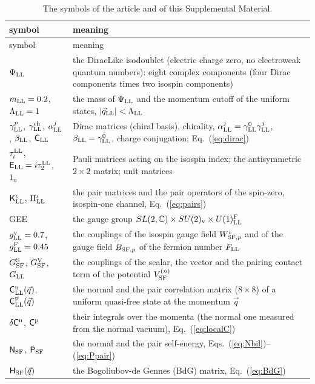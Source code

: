 \documentclass[aps,prd,onecolumn,superscriptaddress,nofootinbib,floatfix,longbibliography]{revtex4-2}
\newcommand{\LL}{{\rm LL}}
\newcommand{\SF}{{\rm SF}}
\begin{document}
\begingroup\small
\begin{longtable}{p{}p{}}
\caption{\label{tab:symbols}The symbols of the article and of this Supplemental Material.}\\
\hline\hline
symbol & meaning \\ \hline
\endfirsthead
\hline symbol & meaning \\ \hline
\endhead
\hline\hline
\endlastfoot
$\Psi_\LL$ & the DiracLike isodoublet (electric charge zero, no electroweak quantum numbers): eight complex components (four Dirac components times two isospin components) \\
$m_\LL=0.2$, $\Lambda_\LL=1$ & the mass of $\Psi_\LL$ and the momentum cutoff of the uniform states, $|\vec q_\LL|<\Lambda_\LL$ \\
$\gamma^p_\LL$, $\gamma^{\rm ch}_\LL$, $\alpha^j_\LL$, $\beta_\LL$, $\mathsf C_\LL$ & Dirac matrices (chiral basis), chirality, $\alpha^j_\LL=\gamma^0_\LL\gamma^j_\LL$, $\beta_\LL=\gamma^0_\LL$, charge conjugation; Eq.~(\ref{eq:dirac}) \\
$\tau^\LL_\iota$, $\mathsf E_\LL=i\tau^\LL_2$, $\mathsf 1_n$ & Pauli matrices acting on the isospin index; the antisymmetric $2\times2$ matrix; unit matrices \\
$\mathsf K^\iota_\LL$, $\Pi^\iota_\LL$ & the pair matrices and the pair operators of the spin-zero, isospin-one channel, Eq.~(\ref{eq:pairs}) \\
GEE & the gauge group $SL(2,\mathbb C)\times SU(2)_{\rm v}\times U(1)^{\rm F}_\LL$ \\
$g^{\rm v}_\LL=0.7$, $g^{\rm F}_\LL=0.45$ & the couplings of the isospin gauge field $W^\iota_{\SF,p}$ and of the gauge field $B_{\SF,p}$ of the fermion number $F_\LL$ \\
$G^{\rm S}_\SF$, $G^{\rm V}_\SF$, $G_\LL$ & the couplings of the scalar, the vector and the pairing contact term of the potential $V^{(n)}_\SF$ \\
$\mathsf C^{\rm n}_\LL(\vec q)$, $\mathsf C^{\rm p}_\LL(\vec q)$ & the normal and the pair correlation matrix ($8\times8$) of a uniform quasi-free state at the momentum $\vec q$ \\
$\delta\mathsf C^{\rm n}$, $\mathsf C^{\rm p}$ & their integrals over the momenta (the normal one measured from the normal vacuum), Eq.~(\ref{eq:localC}) \\
$\mathsf N_\SF$, $\mathsf P_\SF$ & the normal and the pair self-energy, Eqs.~(\ref{eq:Nbil})--(\ref{eq:Ppair}) \\
$\mathsf H_\SF(\vec q)$ & the Bogoliubov-de Gennes (BdG) matrix, Eq.~(\ref{eq:BdG}) \\

\end{longtable}
\end{document}
